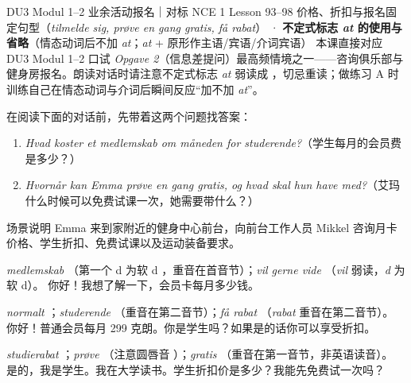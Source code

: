 {DU3 Modul 1--2 业余活动报名｜对标 NCE 1 Lesson 93--98}
{价格、折扣与报名固定句型（\textit{tilmelde sig, prøve en gang gratis, få rabat}） · \textbf{不定式标志 \textit{at} 的使用与省略}（情态动词后不加 \textit{at}；\textit{at} + 原形作主语/宾语/介词宾语）}
{本课直接对应 DU3 Modul 1--2 口试 \textit{Opgave 2}（信息差提问）最高频情境之一——咨询俱乐部与健身房报名。朗读对话时请注意不定式标志 \textit{at} 弱读成 ，切忌重读；做练习 A 时训练自己在情态动词与介词后瞬间反应“加不加 \textit{at}”。}

\begin{foerduleaeser}
在阅读下面的对话前，先带着这两个问题找答案：
\begin{enumerate}
  \item \textit{Hvad koster et medlemskab om måneden for studerende?}（学生每月的会员费是多少？）
  \item \textit{Hvornår kan Emma prøve en gang gratis, og hvad skal hun have med?}（艾玛什么时候可以免费试课一次，她需要带什么？）
\end{enumerate}
\end{foerduleaeser}


\begin{tipbox}{场景说明}
Emma 来到家附近的健身中心前台，向前台工作人员 Mikkel 咨询月卡价格、学生折扣、免费试课以及运动装备要求。
\end{tipbox}

{\textit{medlemskab} （第一个 d 为软 d ，重音在首音节）；\textit{vil gerne vide} （\textit{vil} 弱读，\textit{d} 为软 d）。}
{你好！我想了解一下，会员卡每月多少钱。}

{\textit{normalt} ；\textit{studerende} （重音在第二音节）；\textit{få rabat} （\textit{rabat} 重音在第二音节）。}
{你好！普通会员每月 299 克朗。你是学生吗？如果是的话你可以享受折扣。}

{\textit{studierabat} ；\textit{prøve} （注意圆唇音 ）；\textit{gratis} （重音在第一音节，非英语读音）。}
{是的，我是学生。我在大学读书。学生折扣价是多少？我能先免费试一次吗？}

